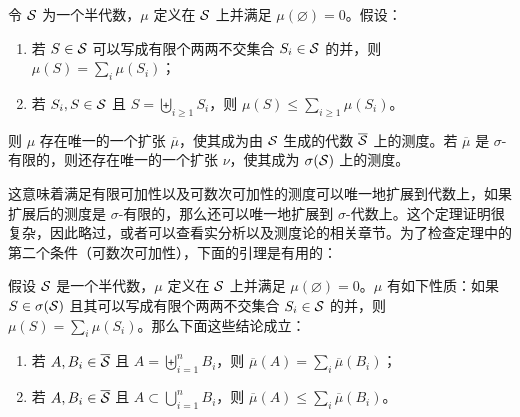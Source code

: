 \begin{theorem}\label{theorem-1-1-3}
    令 $\mathcal{S}$ 为一个半代数，$\mu$ 定义在 $\mathcal{S}$ 上并满足 $\mu(\varnothing) = 0$。假设：
    \begin{enumerate}
        \item 若 $S \in \mathcal{S}$ 可以写成有限个两两不交集合 $S_i \in \mathcal{S}$ 的并，则 $\mu(S) = \sum_i \mu(S_i)$；
        \item 若 $S_i, S \in \mathcal{S}$ 且 $S = \biguplus_{i \ge 1} S_i$，则 $\mu(S) \le \sum_{i \ge 1} \mu(S_i)$。
    \end{enumerate}
    则 $\mu$ 存在唯一的一个扩张 $\overline{\mu}$，使其成为由 $\mathcal{S}$ 生成的代数 $\overline{\mathcal{S}}$ 上的测度。若 $\overline{\mu}$ 是 $\sigma$-有限的，则还存在唯一的一个扩张 $\nu$，使其成为 $\sigma(\mathcal{S})$ 上的测度。
\end{theorem}

这意味着满足有限可加性以及可数次可加性的测度可以唯一地扩展到代数上，如果扩展后的测度是 $\sigma$-有限的，那么还可以唯一地扩展到 $\sigma$-代数上。这个定理证明很复杂，因此略过，或者可以查看实分析以及测度论的相关章节。为了检查定理中的第二个条件（可数次可加性），下面的引理是有用的：

\begin{lemma}\label{lemma-1-1-2}
    假设 $\mathcal{S}$ 是一个半代数，$\mu$ 定义在 $\mathcal{S}$ 上并满足 $\mu(\varnothing) = 0$。$\mu$ 有如下性质：如果 $S \in \sigma(\mathcal{S})$ 且其可以写成有限个两两不交集合 $S_i \in \mathcal{S}$ 的并，则 $\mu(S) = \sum_i \mu(S_i)$。那么下面这些结论成立：
    \begin{enumerate}
        \item 若 $A,B_i \in \overline{\mathcal{S}}$ 且 $A = \biguplus_{i=1}^n B_i$，则 $\overline{\mu}(A) = \sum_i \overline{\mu}(B_i)$；
        \item 若 $A,B_i \in \overline{\mathcal{S}}$ 且 $A \subset \bigcup_{i=1}^n B_i$，则 $\overline{\mu}(A) \le \sum_i \overline{\mu}(B_i)$。
    \end{enumerate}
\end{lemma}

